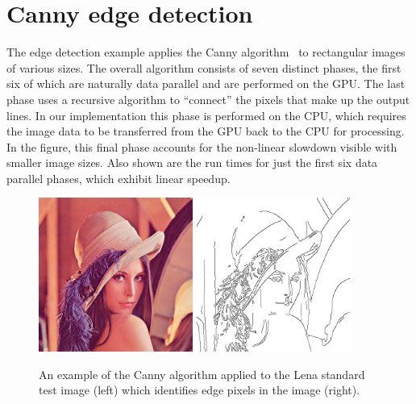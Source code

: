 \section{Canny edge detection}
\label{sec:canny}

The edge detection example applies the Canny algorithm~\cite{Canny:1986et} to
rectangular images of various sizes. The overall algorithm consists of seven
distinct phases, the first six of which are naturally data parallel and are
performed on the GPU. The last phase uses a recursive algorithm to ``connect''
the pixels that make up the output lines. In our implementation this phase is
performed on the CPU, which requires the image data to be transferred from the
GPU back to the CPU for processing. In the figure, this final phase accounts for
the non-linear slowdown visible with smaller image sizes. Also shown are the run
times for just the first six data parallel phases, which exhibit linear speedup.

\begin{figure}
    \begin{center}
        \includegraphics[width=0.45\textwidth]{images/sec-6/canny/lena}
        \includegraphics[width=0.45\textwidth]{images/sec-6/canny/lena-edges}
    \end{center}
    \caption[Example of the Canny edge detection algorithm]{An example of the
        Canny algorithm applied to the Lena standard test image (left) which
        identifies edge pixels in the image (right).}
    \label{fig:lena}
\end{figure}

